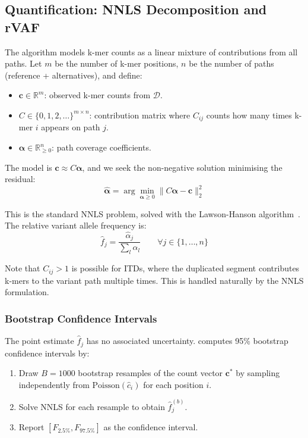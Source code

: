 \subsection{Quantification: NNLS Decomposition and rVAF}
\label{sec:nnls}

The \km{} algorithm models k-mer counts as a linear mixture of contributions
from all paths.  Let $m$ be the number of k-mer positions, $n$ be the number of
paths (reference + alternatives), and define:
\begin{itemize}
  \item $\mathbf{c} \in \mathbb{R}^m$: observed k-mer counts from $\mathcal{D}$.
  \item $C \in \{0,1,2,\ldots\}^{m \times n}$: contribution matrix where
    $C_{ij}$ counts how many times k-mer $i$ appears on path $j$.
  \item $\boldsymbol{\alpha} \in \mathbb{R}_{\geq 0}^n$: path coverage coefficients.
\end{itemize}

The model is $\mathbf{c} \approx C\boldsymbol{\alpha}$, and we seek the
non-negative solution minimising the residual:
\begin{equation}
  \hat{\boldsymbol{\alpha}} = \arg\min_{\boldsymbol{\alpha} \geq 0}
    \|C\boldsymbol{\alpha} - \mathbf{c}\|_2^2
  \label{eq:nnls}
\end{equation}

This is the standard NNLS problem, solved with the Lawson-Hanson
algorithm~\cite{lawson1974solving}.  The relative variant allele frequency is:
\begin{equation}
  \hat{f}_j = \frac{\hat{\alpha}_j}{\sum_{l} \hat{\alpha}_l}
  \qquad \forall j \in \{1,\ldots,n\}
  \label{eq:rvaf}
\end{equation}

Note that $C_{ij} > 1$ is possible for ITDs, where the duplicated segment
contributes k-mers to the variant path multiple times.  This is handled
naturally by the NNLS formulation.

\subsubsection{Bootstrap Confidence Intervals}

The point estimate $\hat{f}_j$ has no associated uncertainty.  \kmerdet{}
computes 95\% bootstrap confidence intervals by:
\begin{enumerate}
  \item Draw $B = 1000$ bootstrap resamples of the count vector $\mathbf{c}^*$
        by sampling independently from $\text{Poisson}(\hat{c}_i)$ for each
        position $i$.
  \item Solve NNLS for each resample to obtain $\hat{f}_j^{(b)}$.
  \item Report $[F_{2.5\%}, F_{97.5\%}]$ as the confidence interval.
\end{enumerate}


